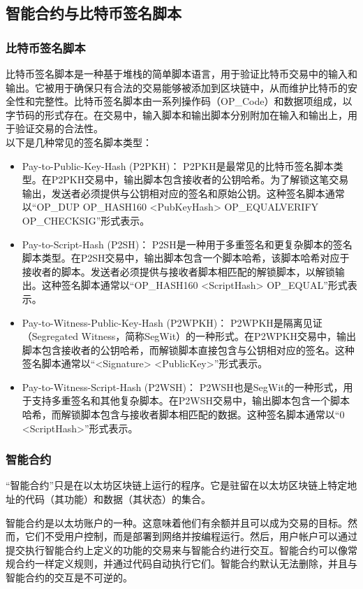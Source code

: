 \documentclass{article}
\begin{document}
\subsection{智能合约与比特币签名脚本}
\subsubsection{比特币签名脚本}
\par 比特币签名脚本是一种基于堆栈的简单脚本语言，用于验证比特币交易中的输入和输出。它被用于确保只有合法的交易能够被添加到区块链中，从而维护比特币的安全性和完整性。比特币签名脚本由一系列操作码（OP\_Code）和数据项组成，以字节码的形式存在。在交易中，输入脚本和输出脚本分别附加在输入和输出上，用于验证交易的合法性。\cite{wikicontracts}\\
以下是几种常见的签名脚本类型：
\begin{itemize}
    \item Pay-to-Public-Key-Hash (P2PKH)： P2PKH是最常见的比特币签名脚本类型。在P2PKH交易中，输出脚本包含接收者的公钥哈希。为了解锁这笔交易输出，发送者必须提供与公钥相对应的签名和原始公钥。这种签名脚本通常以“OP\_DUP OP\_HASH160 <PubKeyHash> OP\_EQUALVERIFY OP\_CHECKSIG”形式表示。
    \item Pay-to-Script-Hash (P2SH)： P2SH是一种用于多重签名和更复杂脚本的签名脚本类型。在P2SH交易中，输出脚本包含一个脚本哈希，该脚本哈希对应于接收者的脚本。发送者必须提供与接收者脚本相匹配的解锁脚本，以解锁输出。这种签名脚本通常以“OP\_HASH160 <ScriptHash> OP\_EQUAL”形式表示。
    \item Pay-to-Witness-Public-Key-Hash (P2WPKH)： P2WPKH是隔离见证（Segregated Witness，简称SegWit）的一种形式。在P2WPKH交易中，输出脚本包含接收者的公钥哈希，而解锁脚本直接包含与公钥相对应的签名。这种签名脚本通常以“<Signature> <PublicKey>”形式表示。
    \item Pay-to-Witness-Script-Hash (P2WSH)： P2WSH也是SegWit的一种形式，用于支持多重签名和其他复杂脚本。在P2WSH交易中，输出脚本包含一个脚本哈希，而解锁脚本包含与接收者脚本相匹配的数据。这种签名脚本通常以“0 <ScriptHash>”形式表示。
\end{itemize}
\subsubsection{智能合约}
\par “智能合约”只是在以太坊区块链上运行的程序。它是驻留在以太坊区块链上特定地址的代码（其功能）和数据（其状态）的集合。
\par 智能合约是以太坊账户的一种。这意味着他们有余额并且可以成为交易的目标。然而，它们不受用户控制，而是部署到网络并按编程运行。然后，用户帐户可以通过提交执行智能合约上定义的功能的交易来与智能合约进行交互。智能合约可以像常规合约一样定义规则，并通过代码自动执行它们。智能合约默认无法删除，并且与智能合约的交互是不可逆的。
\end{document}
